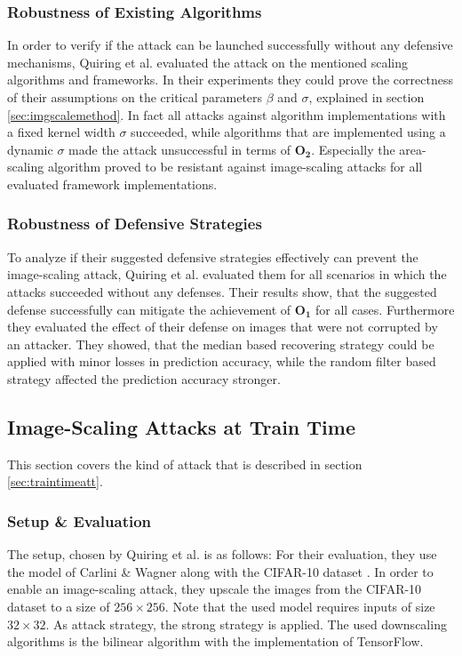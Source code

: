 \documentclass[sigconf]{acmart}
\begin{document}
\subsubsection{Robustness of Existing Algorithms}
In order to verify if the attack can be launched successfully without any defensive mechanisms, Quiring et al. evaluated the attack on the mentioned scaling algorithms and frameworks.
In their experiments they could prove the correctness of their assumptions on the critical parameters $\beta$ and $\sigma$, explained in section \ref{sec:imgscalemethod}. 
In fact all attacks against algorithm implementations with a fixed kernel width $\sigma$ succeeded, while algorithms that are implemented using a dynamic $\sigma$ made the attack unsuccessful in terms of $\boldsymbol{O_2}$.
Especially the area-scaling algorithm proved to be resistant against image-scaling attacks for all evaluated framework implementations.

\subsubsection{Robustness of Defensive Strategies}
To analyze if their suggested defensive strategies effectively can prevent the image-scaling attack, Quiring et al. evaluated them for all scenarios in which the attacks succeeded without any defenses.
Their results show, that the suggested defense successfully can mitigate the achievement of $\boldsymbol{O_1}$ for all cases.
Furthermore they evaluated the effect of their defense on images that were not corrupted by an attacker.
They showed, that the median based recovering strategy could be applied with minor losses in prediction accuracy, while the random filter based strategy affected the prediction accuracy stronger.

\subsection{Image-Scaling Attacks at Train Time}
This section covers the kind of attack that is described in section \ref{sec:traintimeatt}.

\subsubsection{Setup \& Evaluation}
The setup, chosen by Quiring et al.\cite{imgscalepoison} is as follows:
For their evaluation, they use the model of Carlini \& Wagner \cite{7958570} along with the CIFAR-10 dataset \cite{cifar}.
In order to enable an image-scaling attack, they upscale the images from the CIFAR-10 dataset to a size of $256 \times 256$.
Note that the used model requires inputs of size $32 \times 32$.
As attack strategy, the strong strategy is applied.
The used downscaling algorithms is the bilinear algorithm with the implementation of TensorFlow.
\end{document}
